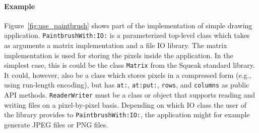 \paragraph{Example}
Figure~\ref{fig:use_paintbrush} shows part of the implementation of simple drawing application. \texttt{PaintbrushWith:IO:} is a parameterized top-level class which takes as arguments a matrix implementation and a file IO library. The matrix implementation is used for storing the pixels inside the application. In the simplest case, this is could be the class \texttt{Matrix} from the Squeak standard library. It could, however, also be a class which stores pixels in a compressed form (e.g., using run-length encoding), but has \texttt{at:}, \texttt{at:put:}, \texttt{rows}, and \texttt{columns} as public API methods. \texttt{ReaderWriter} must be a class or object that supports reading and writing files on a pixel-by-pixel basis. Depending on which IO class the user of the library provides to \texttt{PaintbrushWith:IO:}, the application might for example generate JPEG files or PNG files.

